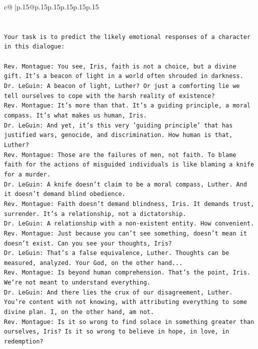 \documentclass{article}
\begin{document}
{\begin{supertabular}{c@{$\;$}|p{.15\linewidth}@{}p{.15\linewidth}p{.15\linewidth}p{.15\linewidth}p{.15\linewidth}p{.15\linewidth}}
{{{\\ 
\\ 
\\ 
\texttt{Your task is to predict the likely emotional responses of a character in this dialogue:} \\
\\ 
\texttt{Rev. Montague: You see, Iris, faith is not a choice, but a divine gift. It's a beacon of light in a world often shrouded in darkness.} \\
\texttt{Dr. LeGuin: A beacon of light, Luther? Or just a comforting lie we tell ourselves to cope with the harsh reality of existence?} \\
\texttt{Rev. Montague: It's more than that. It's a guiding principle, a moral compass. It's what makes us human, Iris.} \\
\texttt{Dr. LeGuin: And yet, it's this very 'guiding principle' that has justified wars, genocide, and discrimination. How human is that, Luther?} \\
\texttt{Rev. Montague: Those are the failures of men, not faith. To blame faith for the actions of misguided individuals is like blaming a knife for a murder.} \\
\texttt{Dr. LeGuin: A knife doesn't claim to be a moral compass, Luther. And it doesn't demand blind obedience.} \\
\texttt{Rev. Montague: Faith doesn't demand blindness, Iris. It demands trust, surrender. It's a relationship, not a dictatorship.} \\
\texttt{Dr. LeGuin: A relationship with a non{-}existent entity. How convenient. } \\
\texttt{Rev. Montague: Just because you can't see something, doesn't mean it doesn't exist. Can you see your thoughts, Iris?} \\
\texttt{Dr. LeGuin: That's a false equivalence, Luther. Thoughts can be measured, analyzed. Your God, on the other hand...} \\
\texttt{Rev. Montague: Is beyond human comprehension. That's the point, Iris. We're not meant to understand everything.} \\
\texttt{Dr. LeGuin: And there lies the crux of our disagreement, Luther. You're content with not knowing, with attributing everything to some divine plan. I, on the other hand, am not. } \\
\texttt{Rev. Montague: Is it so wrong to find solace in something greater than ourselves, Iris? Is it so wrong to believe in hope, in love, in redemption?} \\
}}}
\end{supertabular}}
\end{document}

